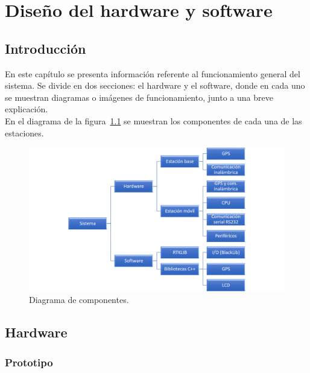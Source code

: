 
\chapter{Diseño del hardware y software}
\label{Chap:DisHard} %


\section{Introducción}

En este capítulo se presenta información referente al funcionamiento general del sistema. Se divide en dos secciones: el hardware y el software, donde en cada uno se muestran diagramas o imágenes de funcionamiento, junto a una breve explicación.\\

En el diagrama de la figura~\ref{fig:diagcomp} se muestran los componentes de cada una de las estaciones.

\begin{figure}[H]
\centering
\includegraphics[scale=0.45]{Figures/DiagramaFinal}
\caption[Diagrama de componentes.]{Diagrama de componentes.}
\label{fig:diagcomp}
\end{figure}

\section{Hardware}

\subsection{Prototipo}

